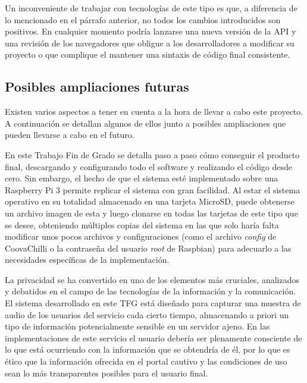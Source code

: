 Un inconveniente de trabajar con tecnologías de este tipo es que, a diferencia de lo mencionado en el párrafo anterior, no todos los cambios introducidos son positivos. En cualquier momento podría lanzarse una nueva versión de la API y una revisión de los navegadores que obligue a los desarrolladores a modificar su proyecto o que complique el mantener una sintaxis de código final consistente.

\subsection{Posibles ampliaciones futuras}

Existen varios aspectos a tener en cuenta a la hora de llevar a cabo este proyecto. A continuación se detallan algunos de ellos junto a posibles ampliaciones que pueden llevarse a cabo en el futuro.


En este Trabajo Fin de Grado se detalla paso a paso cómo conseguir el producto final, descargando y configurando todo el software y realizando el código desde cero. Sin embargo, el hecho de que el sistema esté implementado sobre una Raspberry Pi 3 permite replicar el sistema con gran facilidad. Al estar el sistema operativo en su totalidad almacenado en una tarjeta MicroSD, puede obtenerse un archivo imagen de esta y luego clonarse en todas las tarjetas de este tipo que se desee, obteniendo múltiples copias del sistema en las que solo haría falta modificar unos pocos archivos y configuraciones (como el archivo \emph{config} de CoovaChilli o la contraseña del usuario \emph{root} de Raspbian) para adecuarlo a las necesidades específicas de la implementación.


La privacidad se ha convertido en uno de los elementos más cruciales, analizados y debatidos en el campo de las tecnologías de la información y la comunicación. El sistema desarrollado en este TFG está diseñado para capturar una muestra de audio de los usuarios del servicio cada cierto tiempo, almacenando a priori un tipo de información potencialmente sensible en un servidor ajeno. En las implementaciones de este servicio el usuario debería ser plenamente consciente de lo que está ocurriendo con la información que se obtendría de él, por lo que es ético que la información ofrecida en el portal cautivo y las condiciones de uso sean lo más transparentes posibles para el usuario final.

